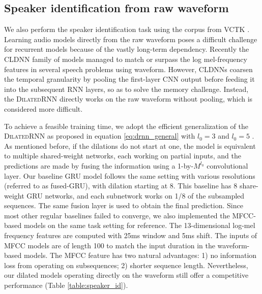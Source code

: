 \documentclass{article}
\newcommand{\algname}{\textsc{DilatedRNN }}
\begin{document}
\subsection{Speaker identification from raw waveform}
We also perform the speaker identification task using the corpus from VCTK \cite{yamagishi2012vctk}.  Learning audio models directly from the raw waveform poses a difficult challenge for recurrent models because of the vastly long-term dependency. Recently the CLDNN family of models \cite{sainath2015learning} managed to match or surpass the log mel-frequency features in several speech problems using waveform. However, CLDNNs coarsen the temporal granularity by pooling the first-layer CNN output before feeding it into the subsequent RNN layers, so as to solve the memory challenge. Instead, the \algname directly works on the raw waveform without pooling, which is considered more difficult. 

To achieve a feasible training time, we adopt the efficient generalization of the \algname as proposed in equation \eqref{eq:drnn_general} with $l_0 = 3$ and $l_0 = 5$ .  As mentioned before, if the dilations do not start at one, the model is equivalent to multiple shared-weight networks, each working on partial inputs, and the predictions are made by fusing the information using a 1-by-$M^{l_0}$ convolutional layer.   Our baseline GRU model follows the same setting with various resolutions (referred to as fused-GRU), with dilation starting at 8. This baseline has 8 share-weight GRU networks, and each subnetwork works on 1/8 of the subsampled sequences.   The same fusion layer is used to obtain the final prediction.   Since most other regular baselines failed to converge, we also implemented the MFCC-based models on the same task setting for reference.   The 13-dimensional log-mel frequency features are computed with 25ms window and 5ms shift.  The inputs of MFCC models are of length 100 to match the input duration in the waveform-based models.  The MFCC feature has two natural advantages: 1) no information loss from operating on subsequences;  2) shorter sequence length.  Nevertheless, our dilated models operating directly on the waveform still offer a competitive performance (Table \ref{table:speaker_id}).
\end{document}
